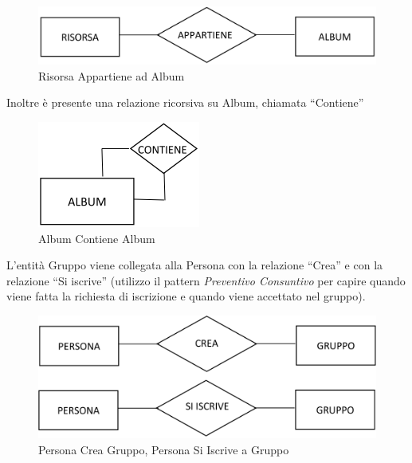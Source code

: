 \begin{center}
\begin{figure}[H]
\centering
\includegraphics[scale=1]{figures/risorsa_appartiene_album.png}
\caption{Risorsa Appartiene ad Album}
\end{figure}
\end{center}

Inoltre è presente una relazione ricorsiva su Album, chiamata “Contiene” 

\begin{center}
\begin{figure}[H]
\centering
\includegraphics[scale=1]{figures/album_contiene_album.png}
\caption{Album Contiene Album}
\end{figure}
\end{center}

L’entità Gruppo viene collegata alla Persona con la relazione “Crea” e con la relazione “Si iscrive” (utilizzo il pattern \textit{Preventivo Consuntivo} per capire quando viene fatta la richiesta di iscrizione e quando viene accettato nel gruppo). 

\begin{center}
\begin{figure}[H]
\centering
\includegraphics[scale=1]{figures/pcg_psig.png}
\caption{Persona Crea Gruppo, Persona Si Iscrive a Gruppo}
\end{figure}
\end{center}

